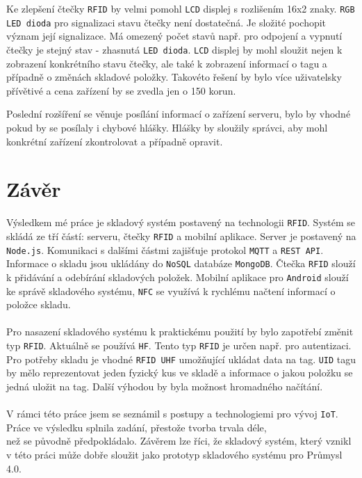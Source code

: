 \documentclass[czech,BP]{thesiskiv}
\begin{document}
Ke zlepšení čtečky \texttt{RFID} by velmi pomohl \texttt{LCD} displej s rozlišením 16x2 znaky. 
\texttt{RGB LED dioda} pro signalizaci stavu čtečky není dostatečná.
Je složité pochopit význam její signalizace. Má omezený počet stavů např. pro odpojení a vypnutí čtečky je stejný stav - zhasnutá \texttt{LED dioda}.
\texttt{LCD} displej by mohl sloužit nejen k zobrazení konkrétního stavu čtečky, ale také k zobrazení informací o tagu a případně o změnách skladové položky.
Takovéto řešení by bylo více uživatelsky přívětivé a cena zařízení by se zvedla jen o 150 korun.

Poslední rozšíření se věnuje posílání informací o zařízení serveru, bylo by vhodné pokud by se posílaly i chybové hlášky. Hlášky by sloužily správci, aby mohl konkrétní zařízení zkontrolovat a případně opravit.

\chapter{Závěr}
Výsledkem mé práce je skladový systém postavený na technologii \texttt{RFID}. Systém se skládá ze tří částí: serveru, čtečky \texttt{RFID} a mobilní aplikace. Server je postavený na \texttt{Node.js}. Komunikaci s dalšími částmi zajišťuje protokol \texttt{MQTT} a \texttt{REST API}. Informace o skladu jsou ukládány do \texttt{NoSQL} databáze \texttt{MongoDB}. Čtečka \texttt{RFID} slouží k přidávání a odebírání skladových položek. Mobilní aplikace pro \texttt{Android} slouží ke správě skladového systému, \texttt{NFC} se využívá k rychlému načtení informací o položce skladu.
\\\\
Pro nasazení skladového systému k praktickému použití by bylo zapotřebí změnit typ \texttt{RFID}. Aktuálně se používá \texttt{HF}. Tento typ \texttt{RFID} je určen např. pro autentizaci.
Pro potřeby skladu je vhodné \texttt{RFID UHF} umožňující ukládat data na tag.
\texttt{UID} tagu by mělo reprezentovat jeden fyzický kus ve skladě a informace o jakou položku se jedná uložit na tag. Další výhodou by byla možnost hromadného načítání.
\\\\
V rámci této práce jsem se seznámil s postupy a technologiemi pro vývoj \texttt{IoT}. Práce ve výsledku splnila zadání, přestože tvorba trvala déle,\\ než se původně předpokládalo.   
Závěrem lze říci, že skladový systém, který vznikl v této práci může dobře sloužit jako prototyp skladového systému pro Průmysl 4.0. 
\end{document}
